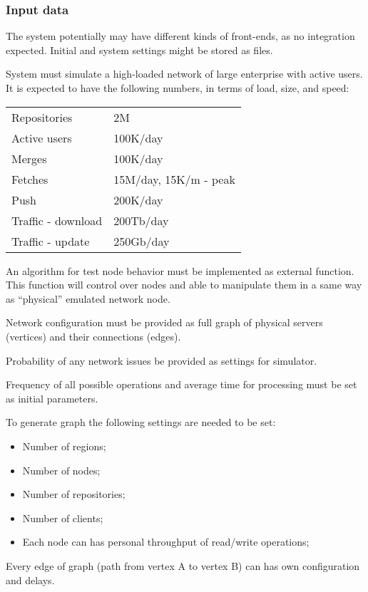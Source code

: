 \documentclass[12pt,oneside]{article}
\begin{document}
\subsubsection{Input data}
\label{sec:input}

The system potentially may have different kinds of front-ends, as no integration expected. Initial and system settings might be stored as files.
    
System must simulate a high-loaded network of large enterprise with active users. It is expected to have the following numbers, in terms of load, size, and speed:

\begin{tabular}{ll}
  Repositories & 2M \\
  Active users & 100K/day \\
  Merges & 100K/day \\
  Fetches & 15M/day, 15K/m - peak \\
  Push & 200K/day \\
  Traffic - download & 200Tb/day \\
  Traffic - update & 250Gb/day \\
\end{tabular}

An algorithm for test node behavior must be implemented as external function. This function will control over nodes and able to manipulate them in a same way as ``physical'' emulated network node.

Network configuration must be provided as full graph of physical servers (vertices) and their connections (edges).

Probability of any network issues be provided as settings for simulator.

Frequency of all possible operations and average time for processing must be set as initial parameters.

To generate graph the following settings are needed to be set:
\begin{itemize}
    \item Number of regions;
    \item Number of nodes;
    \item Number of repositories;
    \item Number of clients;
    \item Each node can has personal throughput of read/write operations;
\end{itemize}

Every edge of graph (path from vertex A to vertex B) can has own configuration and delays.
\end{document}
